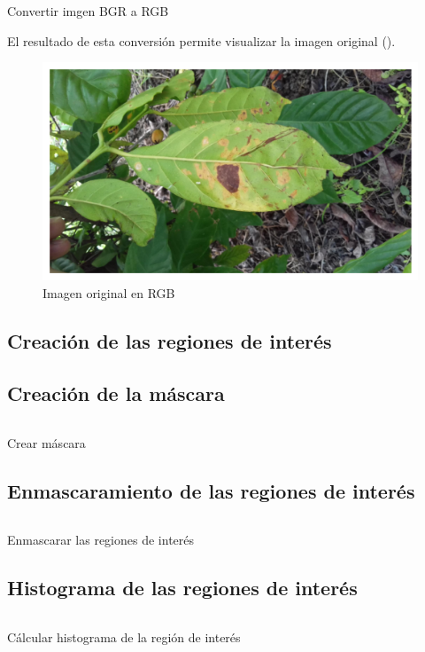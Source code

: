 \begin{listing}[!ht]
\inputminted{python}{code_listings/bgr_to_rgb.py}
\caption{Convertir imgen BGR a RGB}
\label{code:bgr_to_rgb}
\end{listing}

El resultado de esta conversión permite visualizar la imagen original ().

\begin{figure}[hbtp]
\centering
\includegraphics[scale=1]{images/original_image.png}
\caption{Imagen original en RGB}
\label{img:original}
\end{figure}

\subsection{Creación de las regiones de interés}

\subsection{Creación de la máscara}
\begin{listing}[!ht]
\inputminted{python}{code_listings/mask.py}
\caption{Crear máscara}
\label{code:mask}
\end{listing}

\subsection{Enmascaramiento de las regiones de interés}
\begin{listing}[!ht]
\inputminted{python}{code_listings/masked_roi.py}
\caption{Enmascarar las regiones de interés}
\label{code:masked_roi}
\end{listing}

\subsection{Histograma de las regiones de interés}
\begin{listing}[!ht]
\inputminted{python}{code_listings/histogram.py}
\caption{Cálcular histograma de la región de interés}
\label{code:histogram}
\end{listing}

